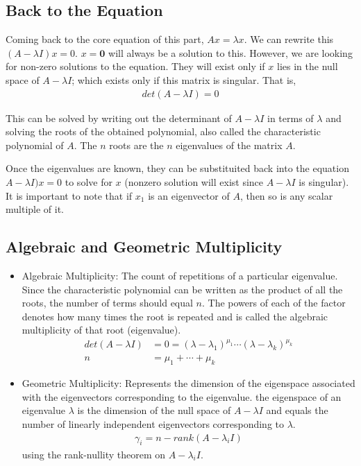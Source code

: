 \documentclass[../../linear_algebra.tex]{subfiles}
\begin{document}
\subsection{Back to the Equation}
Coming back to the core equation of this part, $Ax = \lambda x$. We can rewrite this $(A - \lambda I)x = 0$. $x = \mathbf{0}$ will always be a solution to this. However, we are looking for non-zero solutions to the equation. They will exist only if $x$ lies in the null space of $A - \lambda I$; which exists only if this matrix is singular. That is,
\begin{align*}
    det(A - \lambda I) = 0
\end{align*}

This can be solved by writing out the determinant of $A - \lambda I$ in terms of $\lambda$ and solving the roots of the obtained polynomial, also called the characteristic polynomial of $A$. The $n$ roots are the $n$ eigenvalues of the matrix $A$.\newline

Once the eigenvalues are known, they can be substituited back into the equation $A - \lambda I)x = 0$ to solve for $x$ (nonzero solution will exist since $A - \lambda I$ is singular). It is important to note that if $x_{1}$ is an eigenvector of $A$, then so is any scalar multiple of it.

\subsection{Algebraic and Geometric Multiplicity}
\begin{itemize}
    \item Algebraic Multiplicity: The count of repetitions of a particular eigenvalue.\newline
    Since the characteristic polynomial can be written as the product of all the roots, the number of terms should equal $n$. The powers of each of the factor denotes how many times the root is repeated and is called the algebraic multiplicity of that root (eigenvalue).
    \begin{align*}
        det(A - \lambda I) &= 0 = (\lambda - \lambda_{1})^{\mu_{1}} \cdots (\lambda - \lambda_{k})^{\mu_{k}}\\
        n &= \mu_{1} + \cdots + \mu_{k}
    \end{align*}
    \item Geometric Multiplicity: Represents the dimension of the eigenspace associated with the eigenvectors corresponding to the eigenvalue.\newline
    the eigenspace of an eigenvalue $\lambda$ is the dimension of the null space of $A - \lambda I$ and equals the number of linearly independent eigenvectors corresponding to $\lambda$.
    \begin{align*}
        \gamma_{i} = n - rank(A - \lambda_{i}I)
    \end{align*}
    using the rank-nullity theorem on $A - \lambda_{i}I$.
\end{itemize}
\end{document}

